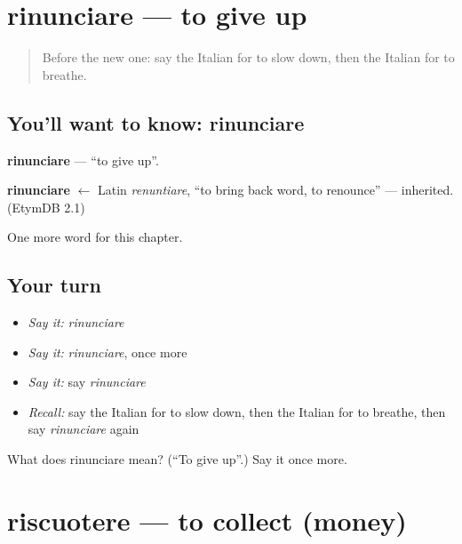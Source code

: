 \section[rinunciare]{rinunciare — to give up}

\label{lesson:IT-C242-rinunciare}



\begin{quote}
Before the new one: say the Italian for to slow down, then the Italian for to breathe.
\end{quote}

\subsection*{You'll want to know: rinunciare}
\textbf{rinunciare} — \textquotedblleft{}to give up\textquotedblright{}.

\begin{cousinweb}
\textbf{rinunciare} $\leftarrow$ Latin \emph{renuntiare}, \textquotedblleft{}to bring back word, to renounce\textquotedblright{} — inherited. (EtymDB 2.1)
\end{cousinweb}

\begin{grammarlens}[title={What you've built}]
One more word for this chapter.
\end{grammarlens}

\subsection*{Your turn}
\begin{itemize}
\raggedright
  \item \emph{Say it:} \emph{rinunciare}
  \item \emph{Say it:} \emph{rinunciare}, once more
  \item \emph{Say it:} say \emph{rinunciare}
  \item \emph{Recall:} say the Italian for to slow down, then the Italian for to breathe, then say \emph{rinunciare} again
\end{itemize}

\begin{tcolorbox}[breakable,colback=teal!4,colframe=teal!35!black,title={Before you move on}]
What does rinunciare mean? (\textquotedblleft{}To give up\textquotedblright{}.) Say it once more.
\end{tcolorbox}
\section[riscuotere]{riscuotere — to collect (money)}


